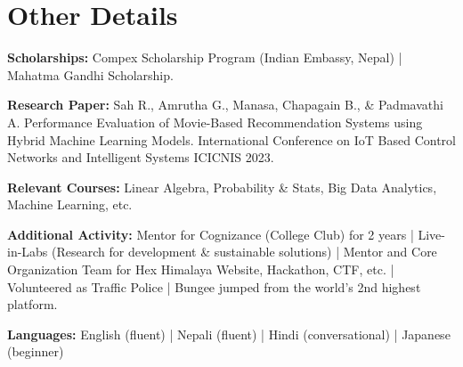 \documentclass[a4paper,11pt]{article}
\begin{document}
\section{Other Details}
\begin{itemize}[leftmargin=0.15in, label={}]
	\setlength\itemsep{-2pt}
	\small{
\item{
		      \textbf{Scholarships:}{ Compex Scholarship Program (Indian Embassy, Nepal) | Mahatma Gandhi Scholarship.} \\
		}

\item{
		      \textbf{Research Paper:}{ Sah R., Amrutha G., Manasa, Chapagain B., \& Padmavathi A. Performance Evaluation of Movie-Based Recommendation Systems using Hybrid Machine Learning Models. International Conference on IoT Based Control Networks and Intelligent Systems ICICNIS 2023.
		      	} \\
		}
		
		\item{
		      \textbf{Relevant Courses:}{ Linear Algebra, Probability \& Stats, Big Data Analytics, Machine Learning, etc.} \\
		}

    	
 
 \item{
		\textbf{Additional Activity:}{ Mentor for Cognizance (College Club) for 2 years | Live-in-Labs (Research for development \& sustainable solutions) | Mentor and Core Organization Team for Hex Himalaya Website, Hackathon, CTF, etc.} | Volunteered as Traffic Police |  Bungee jumped from the world's 2nd highest platform. \\
		}

		\item{
		      \textbf{Languages:}{ English (fluent) | Nepali (fluent) | Hindi (conversational) | Japanese (beginner)}
	}
 
 }
\end{itemize}

\end{document}
